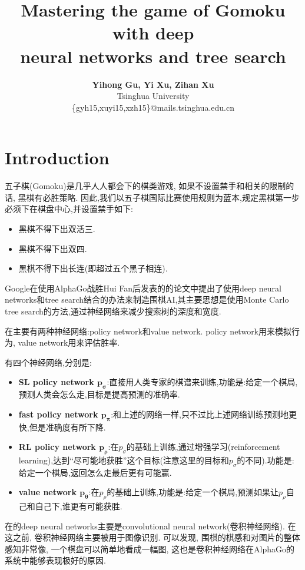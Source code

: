 \documentclass[twocolumn]{article}
\title{\LARGE\textbf{Mastering the game of Gomoku with deep \\ neural networks and tree search} \\}
\author{\textbf{Yihong Gu, Yi Xu, Zihan Xu}\\ Tsinghua University \\ \normalsize\ttfamily\selectfont\{gyh15,xuyi15,xzh15\}@mails.tsinghua.edu.cn}
\date{}
\begin{document}
\maketitle

\section{Introduction}

五子棋(Gomoku)是几乎人人都会下的棋类游戏, 如果不设置禁手和相关的限制的话, 黑棋有必胜策略. 因此,我们以五子棋国际比赛使用规则\cite{rule}为蓝本,规定黑棋第一步必须下在棋盘中心,并设置禁手如下:

\begin{itemize}
	\item 黑棋不得下出双活三.
	\item 黑棋不得下出双四.
	\item 黑棋不得下出长连(即超过五个黑子相连).
\end{itemize}

Google在使用AlphaGo战胜Hui Fan后发表的\cite{alphago}的论文中提出了使用deep neural networks和tree search结合的办法来制造围棋AI,其主要思想是使用Monte Carlo tree search的方法,通过神经网络来减少搜索树的深度和宽度.

在\cite{alphago}主要有两种神经网络:policy network和value network. policy network用来模拟行为, value network用来评估胜率.

有四个神经网络,分别是:

\begin{itemize}
	\item \textbf{SL policy network $\bm{p_\sigma}$}:直接用人类专家的棋谱来训练,功能是:给定一个棋局,预测人类会怎么走,目标是提高预测的准确率.
	\item \textbf{fast policy network $\bm{p_\pi}$}:和上述的网络一样,只不过比上述网络训练预测地更快,但是准确度有所下降.
	\item \textbf{RL policy network $\bm{p_\rho}$}:在$p_\sigma$的基础上训练,通过增强学习(reinforcement learning),达到“尽可能地获胜”这个目标(注意这里的目标和$p_\sigma$的不同).功能是:给定一个棋局,返回怎么走最后更有可能赢.
	\item \textbf{value network $\bm{p_\theta}$}:在$p_\rho$的基础上训练,功能是:给定一个棋局,预测如果让$p_\rho$自己和自己下,谁更有可能获胜.
\end{itemize}

在\cite{alphago}的deep neural networks主要是convolutional neural network(卷积神经网络). 在这之前, 卷积神经网络主要被用于图像识别. 可以发现, 围棋的棋感和对图片的整体感知非常像, 一个棋盘可以简单地看成一幅图, 这也是卷积神经网络在AlphaGo的系统中能够表现极好的原因.
\end{document}
